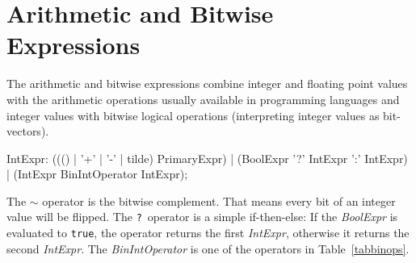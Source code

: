 \section{Arithmetic and Bitwise Expressions}

The arithmetic and bitwise expressions combine integer and floating point values with the arithmetic operations usually available in programming languages
and integer values with bitwise logical operations (interpreting integer values as bit-vectors).

\begin{rail}
  IntExpr: ((() | '+' | '-' | tilde) PrimaryExpr) | (BoolExpr '?' IntExpr ':' IntExpr) | (IntExpr BinIntOperator IntExpr);
\end{rail}
The $\sim$ operator is the bitwise complement.
That means every bit of an integer value will be flipped.
The \texttt{?}\ operator is a simple if-then-else: If the \emph{BoolExpr} is evaluated to \texttt{true}, the operator returns the first \emph{IntExpr}, otherwise it returns the second \emph{IntExpr}.
The \emph{BinIntOperator} is one of the operators in Table~\ref{tabbinops}.
